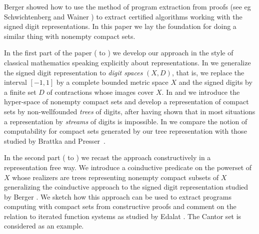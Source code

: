 \documentclass[microtype]{jloganal}
\theoremstyle{plain}
\theoremstyle{definition}
\begin{document}
Berger \cite{Berger11} showed how to use the method of program extraction 
from proofs 
(see eg Schwichtenberg and Wainer \cite{SchwichtenbergWainer12})
to extract certified algorithms 
working with the signed digit representations. 
In this paper we lay the foundation for doing a similar
thing with nonempty compact sets. 


In the first part of the paper 
( to ) 
we develop our approach in the style of classical mathematics 
speaking explicitly about representations. 
In  we generalize the signed digit representation to 
\emph{digit spaces} $(X,D)$, that is, we replace the interval $[-1,1]$ 
by a complete bounded metric space $X$ and the signed digits by a 
finite set $D$ of contractions whose images cover $X$.
In  and  we introduce the hyper-space
of nonempty compact sets and develop a representation of compact sets by non-wellfounded 
\emph{trees} of digits, after having shown that in most situations a representation by
\emph{streams} of digits is impossible.
In  we compare the notion of computability for compact sets 
generated by our tree representation with those studied by Brattka and Presser~\cite{BrattkaPresser03}.

In the second part
( to ) we recast the approach constructively 
in a representation free way.
We introduce a coinductive predicate on the powerset of $X$ whose realizers 
are trees representing nonempty compact subsets of $X$ generalizing the
coinductive approach to the signed digit representation studied by Berger \cite{Berger11}.
We sketch how this approach can be used to extract programs computing
with compact sets from constructive proofs and comment on the relation to 
iterated function systems as studied by Edalat \cite{Edalat97}. The Cantor set is considered as an example.
\end{document}
